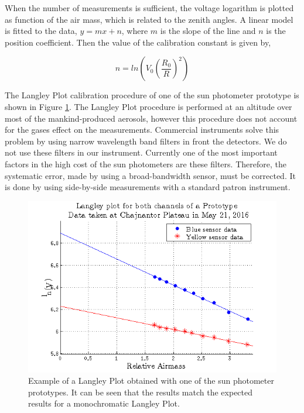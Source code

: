 \documentclass[12pt,letterpaper]{article}
\numberwithin{figure}{section}
\numberwithin{equation}{section}
\numberwithin{table}{section}
\begin{document}
When the number of measurements is sufficient, the voltage logarithm is plotted as function of the air mass, which is related to the zenith angles. A linear model is fitted to the data, $y=mx+n$, where $ m $ is the slope of the line and $n$ is the position coefficient. Then the value of the calibration constant is given by,

\begin{equation}
    n=ln(V_0(\frac{R_0}{R})^2)
    \label{eq:7}
\end{equation}

The Langley Plot calibration procedure of one of the sun photometer prototype is shown in Figure \ref{fig:57}. The Langley Plot procedure is performed at an altitude over most of the mankind-produced aerosols, however this procedure does not account for the gases effect on the measurements. Commercial instruments solve this problem by using narrow wavelength band filters in front the detectors. We do not use these filters in our instrument. Currently one of the most important factors in the high cost of the sun photometers are these filters. Therefore, the systematic error, made by using a broad-bandwidth sensor, must be corrected. It is done by using side-by-side measurements with a standard patron instrument.

\begin{figure}[H]
    \centering
    \includegraphics[scale=0.7]{Figuras/figure_57.png}
    \caption{Example of a Langley Plot obtained with one of the sun photometer prototypes. It can be seen that the results match the expected results for a monochromatic Langley Plot.}
    \label{fig:57}    
\end{figure}
\end{document}
